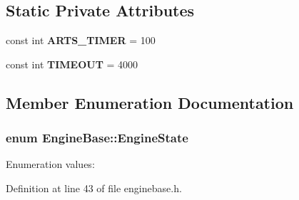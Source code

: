 \subsection*{Static Private Attributes}
\begin{CompactItemize}
\item 
const int {\bf ARTS\_\-TIMER} = 100
\item 
const int {\bf TIMEOUT} = 4000
\end{CompactItemize}


\subsection{Member Enumeration Documentation}
\subsubsection{\setlength{\rightskip}{0pt plus 5cm}enum {\bf Engine\-Base::Engine\-State}\hspace{0.3cm}{\tt  [inherited]}}\label{classEngineBase_EngineBasew7}


\begin{Desc}
\item[Enumeration values: ]\par
\begin{description}
\item[{\em 
Empty\label{classEngineBase_EngineBasew7EngineBasew0}
}]\item[{\em 
Idle\label{classEngineBase_EngineBasew7EngineBasew1}
}]\item[{\em 
Playing\label{classEngineBase_EngineBasew7EngineBasew2}
}]\item[{\em 
Paused\label{classEngineBase_EngineBasew7EngineBasew3}
}]\end{description}
\end{Desc}



Definition at line 43 of file enginebase.h.



